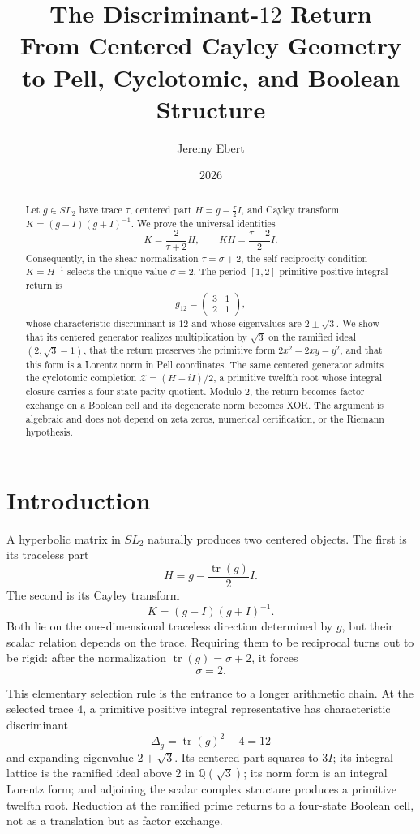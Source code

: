 \documentclass[11pt]{article}
\title{\textbf{The Discriminant-$12$ Return}\\
\large From Centered Cayley Geometry to Pell, Cyclotomic, and Boolean Structure}
\author{Jeremy Ebert}
\date{2026}
\theoremstyle{definition}
\theoremstyle{remark}
\newcommand{\Q}{\mathbb Q}
\newcommand{\tr}{\operatorname{tr}}
\begin{document}
\maketitle

\begin{abstract}
Let $g\in SL_2$ have trace $\tau$, centered part
$H=g-\tfrac{\tau}{2}I$, and Cayley transform
$K=(g-I)(g+I)^{-1}$.  We prove the universal identities
\[
K=\frac{2}{\tau+2}H,
\qquad
KH=\frac{\tau-2}{2}I.
\]
Consequently, in the shear normalization $\tau=\sigma+2$, the
self-reciprocity condition $K=H^{-1}$ selects the unique value $\sigma=2$.
The period-$[1,2]$ primitive positive integral return is
\[
g_{12}=\begin{pmatrix}3&1\\2&1\end{pmatrix},
\]
whose characteristic discriminant is $12$ and whose eigenvalues are
$2\pm\sqrt3$.  We show that its centered generator realizes multiplication
by $\sqrt3$ on the ramified ideal $(2,\sqrt3-1)$, that the return preserves
the primitive form $2x^2-2xy-y^2$, and that this form is a Lorentz norm in
Pell coordinates.  The same centered generator admits the cyclotomic
completion $\mathcal Z=(H+iI)/2$, a primitive twelfth root whose integral
closure carries a four-state parity quotient.  Modulo $2$, the return becomes
factor exchange on a Boolean cell and its degenerate norm becomes XOR.
The argument is algebraic and does not depend on zeta zeros, numerical
certification, or the Riemann hypothesis.
\end{abstract}

\section{Introduction}

A hyperbolic matrix in $SL_2$ naturally produces two centered objects.  The
first is its traceless part
\[
H=g-\frac{\tr(g)}2I.
\]
The second is its Cayley transform
\[
K=(g-I)(g+I)^{-1}.
\]
Both lie on the one-dimensional traceless direction determined by $g$, but
their scalar relation depends on the trace.  Requiring them to be reciprocal
turns out to be rigid: after the normalization $\tr(g)=\sigma+2$, it forces
\[
\sigma=2.
\]

This elementary selection rule is the entrance to a longer arithmetic chain.
At the selected trace $4$, a primitive positive integral representative has
characteristic discriminant
\[
\Delta_g=\tr(g)^2-4=12
\]
and expanding eigenvalue $2+\sqrt3$.  Its centered part squares to $3I$; its
integral lattice is the ramified ideal above $2$ in $\Q(\sqrt3)$; its norm
form is an integral Lorentz form; and adjoining the scalar complex structure
produces a primitive twelfth root.  Reduction at the ramified prime returns
to a four-state Boolean cell, not as a translation but as factor exchange.
\end{document}
